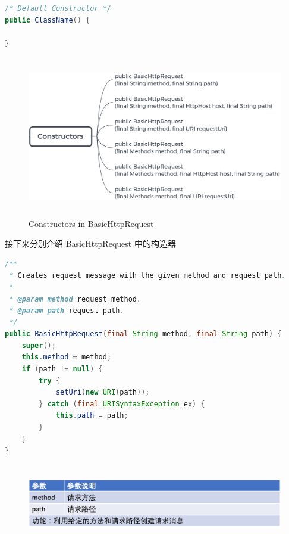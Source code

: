 \documentclass{article}
\begin{document}
	\begin{lstlisting}[language={java}]
/* Default Constructor */
public ClassName() {
	
}
	\end{lstlisting}

	\begin{figure}[H]
		\centering
		\includegraphics[height = 7cm, width = 13cm]{pics/17_Request_constructors.png}	
		\caption{Constructors in BasicHttpRequest}
	\end{figure}
	\begin{CJK}{UTF8}{gbsn}
		接下来分别介绍 BasicHttpRequest 中的构造器
	\end{CJK}{}
	\begin{lstlisting}[language={java}]
/**
 * Creates request message with the given method and request path.
 *
 * @param method request method.
 * @param path request path.
 */
public BasicHttpRequest(final String method, final String path) {
    super();
    this.method = method;
    if (path != null) {
        try {
            setUri(new URI(path));
        } catch (final URISyntaxException ex) {
            this.path = path;
        }
    }
}

	\end{lstlisting}
	\begin{figure}[H]
		\centering
		\includegraphics[height = 3.5cm, width = 18cm]{pics/18_Request_table_1_4.png}	
	\end{figure}
\end{document}
